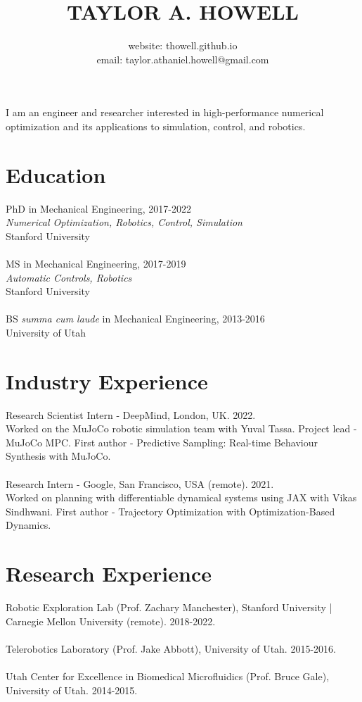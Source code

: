 \documentclass[10pt]{article}
\title{\large \textbf{TAYLOR A. HOWELL}}
\author{
\large
website: thowell.github.io\\
email: taylor.athaniel.howell@gmail.com
}
\date{}
\begin{document}
\maketitle
\noindent
I am an engineer and researcher interested in high-performance numerical optimization and its applications to simulation, control, and robotics.

\section*{Education}
PhD in Mechanical Engineering, 2017-2022\\
\textit{Numerical Optimization, Robotics, Control, Simulation}\\
Stanford University
\\
\\
MS in Mechanical Engineering, 2017-2019\\
\textit{Automatic Controls, Robotics}\\
Stanford University
\\
\\
BS \textit{summa cum laude} in Mechanical Engineering, 2013-2016\\
University of Utah

\section*{Industry Experience}
Research Scientist Intern - DeepMind, London, UK. 2022. \\
Worked on the MuJoCo robotic simulation team with Yuval Tassa. 
Project lead - MuJoCo MPC. 
First author - Predictive Sampling: Real-time Behaviour Synthesis with MuJoCo.
\\
\\ 
Research Intern - Google, San Francisco, USA (remote). 2021. \\
Worked on planning with differentiable dynamical systems using JAX with Vikas Sindhwani. 
First author - Trajectory Optimization with Optimization-Based Dynamics.

\section*{Research Experience}
Robotic Exploration Lab (Prof. Zachary Manchester), Stanford University | Carnegie Mellon University (remote). 2018-2022.
\\
\\
Telerobotics Laboratory (Prof. Jake Abbott), University of Utah. 2015-2016.
\\
\\
Utah Center for Excellence in Biomedical Microfluidics (Prof. Bruce Gale), University of Utah. 2014-2015.
\end{document}
